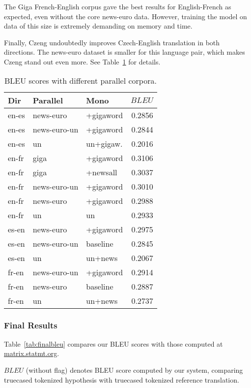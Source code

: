 \documentclass[11pt,letterpaper]{article}
\def\Tref#1{Table~\ref{#1}}
\begin{document}
The Giga French-English corpus gave the best results for English-French as expected,
even without the core news-euro data. However, training the model on data of this size
is extremely demanding on memory and time.

Finally, Czeng undoubtedly improves Czech-English translation in both directions.
The news-euro dataset is smaller for this language pair, which makes Czeng stand out even more.
See \Tref{tab:unbleu} for details.

\begin{table}[htbl]
\begin{center}
\begin{tabular}{l l l r}
Dir & Parallel & Mono & $BLEU$\\
\hline
en-es & news-euro & +gigaword & 0.2856\\
en-es & news-euro-un & +gigaword & 0.2844\\
en-es & un & un+gigaw. & 0.2016\\
\hline
en-fr & giga & +gigaword & 0.3106\\
en-fr & giga & +newsall & 0.3037\\
en-fr & news-euro-un & +gigaword & 0.3010\\
en-fr & news-euro & +gigaword & 0.2988\\
en-fr & un & un & 0.2933\\
\hline
es-en & news-euro & +gigaword & 0.2975\\
es-en & news-euro-un & baseline & 0.2845\\
es-en & un & un+news & 0.2067\\
\hline
fr-en & news-euro-un & +gigaword & 0.2914\\
fr-en & news-euro & baseline & 0.2887\\
fr-en & un & un+news & 0.2737\\
\end{tabular}
\end{center}
\caption{BLEU scores with different parallel corpora.}
\label{tab:unbleu}
\end{table}



\subsubsection{Final Results}
\label{sec:final}

\Tref{tab:finalbleu} compares our BLEU scores with those computed at \url{matrix.statmt.org}.

$BLEU$ (without flag) denotes BLEU score computed by our system,
comparing truecased tokenized hypothesis with truecased tokenized reference translation.
\end{document}
